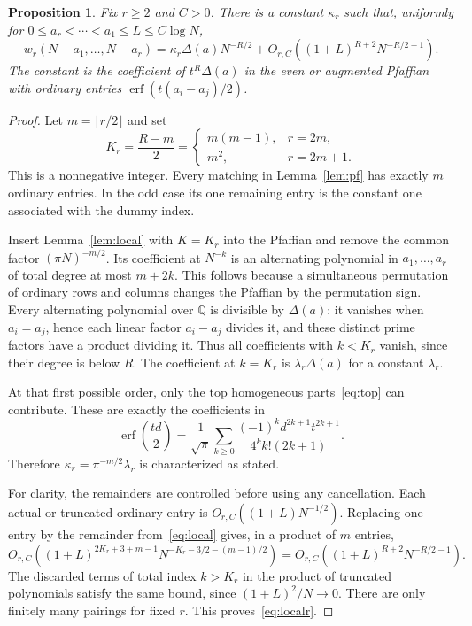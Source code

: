 \documentclass[11pt]{article}
\newtheorem{proposition}[theorem]{Proposition}
\theoremstyle{remark}
\begin{document}
\begin{proposition}\label{prop:localr}
Fix $r\ge2$ and $C>0$. There is a constant $\kappa_r$ such that, uniformly for
$0\le a_r<\cdots<a_1\le L\le C\log N$,
\begin{equation}\label{eq:localr}
 w_r(N-a_1,\ldots,N-a_r)
 =\kappa_r\Delta(a)N^{-R/2}
 +O_{r,C}\left((1+L)^{R+2}N^{-R/2-1}\right).
\end{equation}
The constant is the coefficient of $t^R\Delta(a)$ in the even or augmented
Pfaffian with ordinary entries $\operatorname{erf}(t(a_i-a_j)/2)$.
\end{proposition}
\begin{proof}
Let $m=\lfloor r/2\rfloor$ and set
\[
 K_r=\frac{R-m}{2}=
 \begin{cases}m(m-1),&r=2m,\\m^2,&r=2m+1.\end{cases}
\]
This is a nonnegative integer. Every matching in Lemma~\ref{lem:pf} has exactly
$m$ ordinary entries. In the odd case its one remaining entry is the constant
one associated with the dummy index.

Insert Lemma~\ref{lem:local} with $K=K_r$ into the Pfaffian and remove the common
factor $(\pi N)^{-m/2}$. Its coefficient at $N^{-k}$ is an alternating
polynomial in $a_1,\ldots,a_r$ of total degree at most $m+2k$. This follows
because a simultaneous permutation of ordinary rows and columns changes the
Pfaffian by the permutation sign. Every alternating polynomial over
$\mathbb Q$ is divisible by $\Delta(a)$: it vanishes when $a_i=a_j$, hence each
linear factor $a_i-a_j$ divides it, and these distinct prime factors have a
product dividing it. Thus all coefficients with $k<K_r$ vanish, since their
degree is below $R$. The coefficient at $k=K_r$ is $\lambda_r\Delta(a)$ for a
constant $\lambda_r$.

At that first possible order, only the top homogeneous parts~\eqref{eq:top}
can contribute. These are exactly the coefficients in
\[
 \operatorname{erf}\left(\frac{td}{2}\right)
 =\frac1{\sqrt\pi}\sum_{k\ge0}
       \frac{(-1)^k d^{2k+1}t^{2k+1}}{4^k k!(2k+1)}.
\]
Therefore $\kappa_r=\pi^{-m/2}\lambda_r$ is characterized as stated.

For clarity, the remainders are controlled before using any cancellation.
Each actual or truncated ordinary entry is $O_{r,C}((1+L)N^{-1/2})$.
Replacing one entry by the remainder from~\eqref{eq:local} gives, in a product
of $m$ entries,
\[
 O_{r,C}\left((1+L)^{2K_r+3+m-1}N^{-K_r-3/2-(m-1)/2}\right)
 =O_{r,C}\left((1+L)^{R+2}N^{-R/2-1}\right).
\]
The discarded terms of total index $k>K_r$ in the product of truncated
polynomials satisfy the same bound, since $(1+L)^2/N\to0$. There are only
finitely many pairings for fixed $r$. This proves~\eqref{eq:localr}.
\end{proof}
\end{document}
